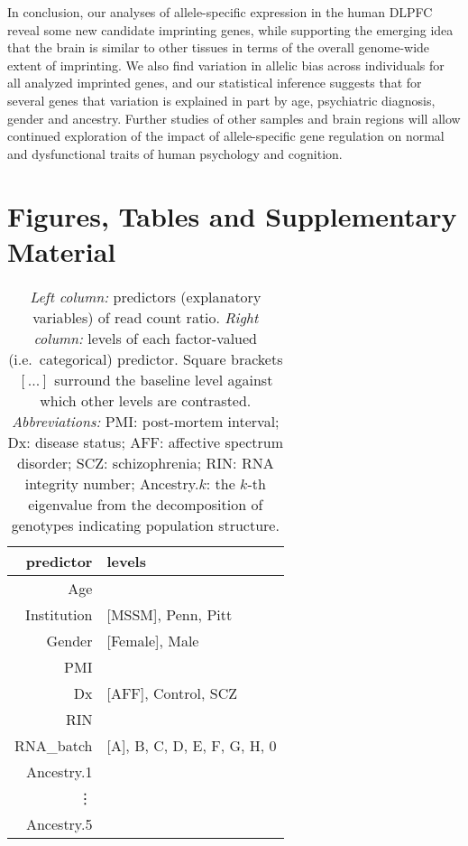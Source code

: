 \documentclass[12pt,letterpaper]{article}
\begin{document}
In conclusion, our analyses of allele-specific expression in the human DLPFC
reveal some new candidate imprinting genes, while supporting the emerging idea
that the brain is similar to other tissues in terms of the overall genome-wide
extent of imprinting.  We also find variation in allelic bias
across individuals for all analyzed imprinted genes, and our statistical
inference suggests that for several genes that variation is explained in part
by age, psychiatric diagnosis, gender and ancestry. Further studies
of other samples and brain regions will allow continued exploration of the
impact of allele-specific gene regulation on normal and dysfunctional traits
of human psychology and cognition.




\newpage

\section{Figures, Tables and Supplementary Material}

\begin{table}[h]
\begin{center}
\begin{tabular}{r|l}
predictor & levels\\
\hline
Age &  \\
Institution & [MSSM], Penn, Pitt\\
Gender & [Female], Male\\
PMI & \\
Dx & [AFF], Control, SCZ\\
RIN &  \\
RNA\_batch & [A], B, C, D, E, F, G, H, 0\\
Ancestry.1 & \\
\vdots & \\
Ancestry.5 &  \\
\end{tabular}
\caption{ \emph{Left column:} predictors (explanatory variables) of read count
ratio.  \emph{Right column:} levels of each factor-valued (i.e.~categorical)
predictor.  Square brackets \([...]\) surround the baseline level against
which other levels are contrasted.  \emph{Abbreviations:} PMI: post-mortem
interval; Dx: disease status; AFF: affective spectrum disorder; SCZ:
schizophrenia; RIN: RNA integrity number;
Ancestry.\(k\): the \(k\)-th eigenvalue from the decomposition of genotypes
indicating population structure.}
\label{tab:predictors}
\end{center}
\end{table}
\end{document}
